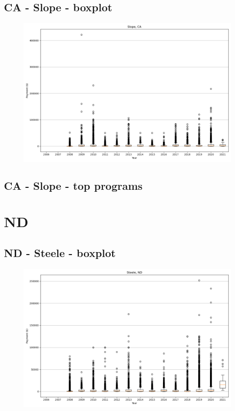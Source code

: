 \subsection*{CA - Slope - boxplot}
\begin{figure}[h]
\centering
\includegraphics[width=7in]{../output/boxplots/counties/Slope-CA_boxplot.png}
\end{figure}


\subsection*{CA - Slope - top programs}

\newpage
\section*{ND}
\subsection*{ND - Steele - boxplot}
\begin{figure}[h]
\centering
\includegraphics[width=7in]{../output/boxplots/counties/Steele-ND_boxplot.png}
\end{figure}


